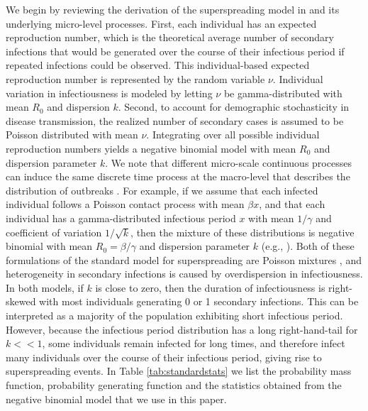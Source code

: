 \documentclass{imammb}
\numberwithin{equation}{section}
\begin{document}
We begin by reviewing the derivation of the superspreading model in \citet{Lloyd-Smith2005-ma} and its underlying micro-level processes. 
First, each individual has an expected reproduction number, which is the theoretical average number of secondary infections that would be generated over the course of their infectious period if repeated infections could be observed. This individual-based expected reproduction number is represented by the random variable $\nu$. Individual variation in infectiousness is modeled by letting $\nu$ be gamma-distributed with mean $R_0$ and dispersion $k$. Second, to account for demographic stochasticity in disease transmission, the realized number of secondary cases is assumed to be Poisson distributed with mean $\nu$. Integrating over all possible individual reproduction numbers yields a negative binomial model with mean $R_0$ and dispersion parameter $k$. We note that different micro-scale continuous processes can induce the same discrete time process at the macro-level that describes the distribution of outbreaks \citep{Mode2000-hp, Garske2008-ax, Yan2008-jc}. For example, if we assume that each infected individual follows a Poisson contact process with mean $\beta x$, and that each individual has a gamma-distributed infectious period $x$ with mean $1/\gamma$ and coefficient of variation $1/\sqrt{k}$, then the mixture of these distributions is negative binomial with mean $R_0 = \beta/\gamma$ and dispersion parameter $k$ (e.g., \citep{Mode2000-hp, Diekmann2013-zu, Yan2008-jc}). Both of these formulations of the standard model for superspreading are Poisson mixtures \citep{Karlis2005-az}, and  heterogeneity in secondary infections is caused by overdispersion in infectiousness. In both models, if $k$ is close to zero, then the duration of infectiousness is right-skewed with most individuals generating 0 or 1 secondary infections. This can be interpreted as a majority of the population exhibiting short infectious period. However, because the infectious period distribution has a long right-hand-tail for $k<<1$, some individuals remain infected for long times, and therefore infect many individuals over the course of their infectious period, giving rise to superspreading events. In Table \ref{tab:standardstats} we list the probability mass function, probability generating function and the statistics obtained from the negative binomial model that we use in this paper. 
\end{document}
